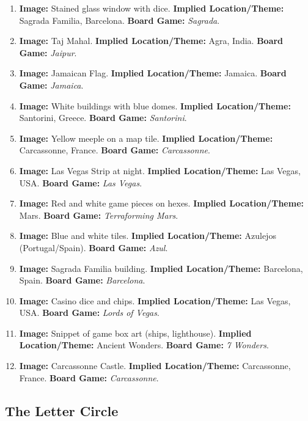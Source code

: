 \documentclass{article}
\begin{document}
\begin{enumerate}
    \item \textbf{Image:} Stained glass window with dice. \textbf{Implied Location/Theme:} Sagrada Familia, Barcelona. \textbf{Board Game:} \textit{Sagrada}.
    \item \textbf{Image:} Taj Mahal. \textbf{Implied Location/Theme:} Agra, India. \textbf{Board Game:} \textit{Jaipur}.
    \item \textbf{Image:} Jamaican Flag. \textbf{Implied Location/Theme:} Jamaica. \textbf{Board Game:} \textit{Jamaica}.
    \item \textbf{Image:} White buildings with blue domes. \textbf{Implied Location/Theme:} Santorini, Greece. \textbf{Board Game:} \textit{Santorini}.
    \item \textbf{Image:} Yellow meeple on a map tile. \textbf{Implied Location/Theme:} Carcassonne, France. \textbf{Board Game:} \textit{Carcassonne}.
    \item \textbf{Image:} Las Vegas Strip at night. \textbf{Implied Location/Theme:} Las Vegas, USA. \textbf{Board Game:} \textit{Las Vegas}.
    \item \textbf{Image:} Red and white game pieces on hexes. \textbf{Implied Location/Theme:} Mars. \textbf{Board Game:} \textit{Terraforming Mars}.
    \item \textbf{Image:} Blue and white tiles. \textbf{Implied Location/Theme:} Azulejos (Portugal/Spain). \textbf{Board Game:} \textit{Azul}.
    \item \textbf{Image:} Sagrada Familia building. \textbf{Implied Location/Theme:} Barcelona, Spain. \textbf{Board Game:} \textit{Barcelona}.
    \item \textbf{Image:} Casino dice and chips. \textbf{Implied Location/Theme:} Las Vegas, USA. \textbf{Board Game:} \textit{Lords of Vegas}.
    \item \textbf{Image:} Snippet of game box art (ships, lighthouse). \textbf{Implied Location/Theme:} Ancient Wonders. \textbf{Board Game:} \textit{7 Wonders}.
    \item \textbf{Image:} Carcassonne Castle. \textbf{Implied Location/Theme:} Carcassonne, France. \textbf{Board Game:} \textit{Carcassonne}.
\end{enumerate}

\subsection{The Letter Circle}
\end{document}
